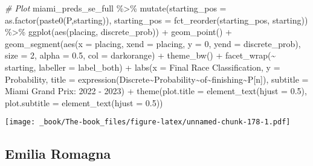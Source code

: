 \documentclass[
]{book}
\newenvironment{Shaded}{\begin{snugshade}}{\end{snugshade}}
\newcommand{\AttributeTok}[1]{\textcolor[rgb]{0.77,0.63,0.00}{#1}}
\newcommand{\CommentTok}[1]{\textcolor[rgb]{0.56,0.35,0.01}{\textit{#1}}}
\newcommand{\DecValTok}[1]{\textcolor[rgb]{0.00,0.00,0.81}{#1}}
\newcommand{\FloatTok}[1]{\textcolor[rgb]{0.00,0.00,0.81}{#1}}
\newcommand{\FunctionTok}[1]{\textcolor[rgb]{0.00,0.00,0.00}{#1}}
\newcommand{\NormalTok}[1]{#1}
\newcommand{\SpecialCharTok}[1]{\textcolor[rgb]{0.00,0.00,0.00}{#1}}
\newcommand{\StringTok}[1]{\textcolor[rgb]{0.31,0.60,0.02}{#1}}
\begin{document}
\begin{Shaded}
\begin{Highlighting}[]
\CommentTok{\# Plot}
\NormalTok{miami\_preds\_se\_full }\SpecialCharTok{\%\textgreater{}\%}
  \FunctionTok{mutate}\NormalTok{(}\AttributeTok{starting\_pos =} \FunctionTok{as.factor}\NormalTok{(}\FunctionTok{paste0}\NormalTok{(}\StringTok{\textquotesingle{}P\textquotesingle{}}\NormalTok{,starting)),}
         \AttributeTok{starting\_pos =} \FunctionTok{fct\_reorder}\NormalTok{(starting\_pos, starting)) }\SpecialCharTok{\%\textgreater{}\%}
  \FunctionTok{ggplot}\NormalTok{(}\FunctionTok{aes}\NormalTok{(placing, discrete\_prob)) }\SpecialCharTok{+}
  \FunctionTok{geom\_point}\NormalTok{() }\SpecialCharTok{+}
  \FunctionTok{geom\_segment}\NormalTok{(}\FunctionTok{aes}\NormalTok{(}\AttributeTok{x =}\NormalTok{ placing, }\AttributeTok{xend =}\NormalTok{ placing, }\AttributeTok{y =} \DecValTok{0}\NormalTok{, }\AttributeTok{yend =}\NormalTok{ discrete\_prob),}
               \AttributeTok{size =} \DecValTok{2}\NormalTok{, }\AttributeTok{alpha =} \FloatTok{0.5}\NormalTok{, }\AttributeTok{col =} \StringTok{\textquotesingle{}darkorange\textquotesingle{}}\NormalTok{) }\SpecialCharTok{+}
  \FunctionTok{theme\_bw}\NormalTok{() }\SpecialCharTok{+}
  \FunctionTok{facet\_wrap}\NormalTok{(}\SpecialCharTok{\textasciitilde{}}\NormalTok{ starting, }\AttributeTok{labeller =}\NormalTok{ label\_both) }\SpecialCharTok{+}
  \FunctionTok{labs}\NormalTok{(}\AttributeTok{x =} \StringTok{\textquotesingle{}Final Race Classification\textquotesingle{}}\NormalTok{,}
       \AttributeTok{y =} \StringTok{\textquotesingle{}Probability\textquotesingle{}}\NormalTok{,}
       \AttributeTok{title =} \FunctionTok{expression}\NormalTok{(Discrete}\SpecialCharTok{\textasciitilde{}}\NormalTok{Probability}\SpecialCharTok{\textasciitilde{}}\NormalTok{of}\SpecialCharTok{\textasciitilde{}}\NormalTok{finishing}\SpecialCharTok{\textasciitilde{}}\NormalTok{P[n]),}
       \AttributeTok{subtitle =} \StringTok{\textquotesingle{}Miami Grand Prix: 2022 {-} 2023\textquotesingle{}}\NormalTok{) }\SpecialCharTok{+}
  \FunctionTok{theme}\NormalTok{(}\AttributeTok{plot.title =} \FunctionTok{element\_text}\NormalTok{(}\AttributeTok{hjust =} \FloatTok{0.5}\NormalTok{),}
        \AttributeTok{plot.subtitle =} \FunctionTok{element\_text}\NormalTok{(}\AttributeTok{hjust =} \FloatTok{0.5}\NormalTok{)) }
\end{Highlighting}
\end{Shaded}

\texttt{[image: \_book/The-book\_files/figure-latex/unnamed-chunk-178-1.pdf]}

\hypertarget{emilia-romagna}{%
\subsection{Emilia Romagna}\label{emilia-romagna}}
\end{document}
